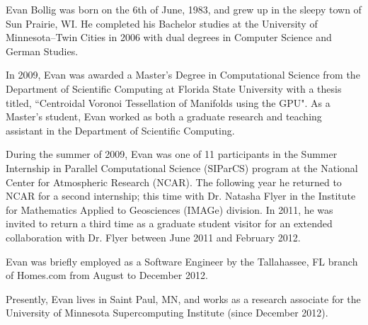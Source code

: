 \begin{biosketch}

Evan Bollig was born on the 6th of June, 1983, and grew up in the sleepy town of Sun Prairie, WI. He completed his Bachelor studies at the University of Minnesota--Twin Cities in 2006 with dual degrees in Computer Science and German Studies. 

In 2009, Evan was awarded a Master's Degree in Computational Science from the Department of Scientific Computing at Florida State University with a thesis titled, ``Centroidal Voronoi Tessellation of Manifolds using the GPU". As a Master's student, Evan worked as both a graduate research and teaching assistant in the Department of Scientific Computing.

During the summer of 2009, Evan was one of 11 participants in the Summer Internship in Parallel Computational Science (SIParCS) program at the National Center for Atmospheric Research (NCAR). The following year he returned to NCAR for a second internship; this time with Dr. Natasha Flyer in the Institute for Mathematics Applied to Geosciences (IMAGe) division. In 2011, he was invited to return a third time as a graduate student visitor for an extended collaboration with Dr. Flyer between June 2011 and February 2012. 

Evan was briefly employed as a Software Engineer by the Tallahassee, FL branch of Homes.com from August to December 2012. 

Presently, Evan lives in Saint Paul, MN, and works as a research associate for the University of Minnesota Supercomputing Institute (since December 2012). 


\end{biosketch}